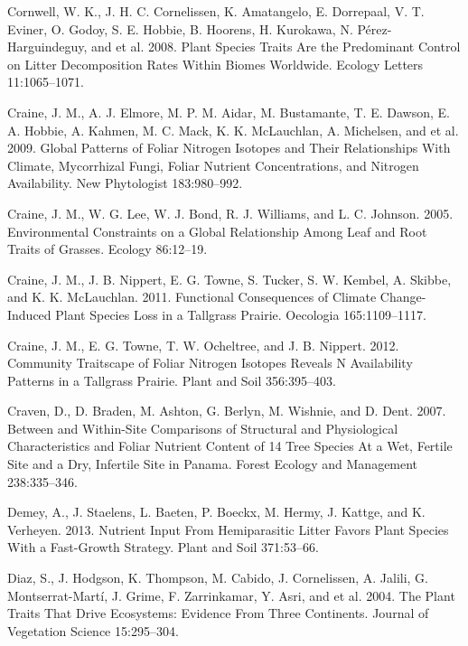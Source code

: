 \documentclass[11pt]{article}
\begin{document}
\begin{hangparas}{1.5em}{1}
\hypertarget{citeproc_bib_item_36}{Cornwell, W. K., J. H. C. Cornelissen, K. Amatangelo, E. Dorrepaal, V. T. Eviner, O. Godoy, S. E. Hobbie, B. Hoorens, H. Kurokawa, N. Pérez-Harguindeguy, and et al. 2008. Plant Species Traits Are the Predominant Control on Litter Decomposition Rates Within Biomes Worldwide. Ecology Letters 11:1065–1071.}

\hypertarget{citeproc_bib_item_37}{Craine, J. M., A. J. Elmore, M. P. M. Aidar, M. Bustamante, T. E. Dawson, E. A. Hobbie, A. Kahmen, M. C. Mack, K. K. McLauchlan, A. Michelsen, and et al. 2009. Global Patterns of Foliar Nitrogen Isotopes and Their Relationships With Climate, Mycorrhizal Fungi, Foliar Nutrient Concentrations, and Nitrogen Availability. New Phytologist 183:980–992.}

\hypertarget{citeproc_bib_item_38}{Craine, J. M., W. G. Lee, W. J. Bond, R. J. Williams, and L. C. Johnson. 2005. Environmental Constraints on a Global Relationship Among Leaf and Root Traits of Grasses. Ecology 86:12–19.}

\hypertarget{citeproc_bib_item_39}{Craine, J. M., J. B. Nippert, E. G. Towne, S. Tucker, S. W. Kembel, A. Skibbe, and K. K. McLauchlan. 2011. Functional Consequences of Climate Change-Induced Plant Species Loss in a Tallgrass Prairie. Oecologia 165:1109–1117.}

\hypertarget{citeproc_bib_item_40}{Craine, J. M., E. G. Towne, T. W. Ocheltree, and J. B. Nippert. 2012. Community Traitscape of Foliar Nitrogen Isotopes Reveals N Availability Patterns in a Tallgrass Prairie. Plant and Soil 356:395–403.}

\hypertarget{citeproc_bib_item_41}{Craven, D., D. Braden, M. Ashton, G. Berlyn, M. Wishnie, and D. Dent. 2007. Between and Within-Site Comparisons of Structural and Physiological Characteristics and Foliar Nutrient Content of 14 Tree Species At a Wet, Fertile Site and a Dry, Infertile Site in Panama. Forest Ecology and Management 238:335–346.}

\hypertarget{citeproc_bib_item_42}{Demey, A., J. Staelens, L. Baeten, P. Boeckx, M. Hermy, J. Kattge, and K. Verheyen. 2013. Nutrient Input From Hemiparasitic Litter Favors Plant Species With a Fast-Growth Strategy. Plant and Soil 371:53–66.}

\hypertarget{citeproc_bib_item_43}{Diaz, S., J. Hodgson, K. Thompson, M. Cabido, J. Cornelissen, A. Jalili, G. Montserrat-Martí, J. Grime, F. Zarrinkamar, Y. Asri, and et al. 2004. The Plant Traits That Drive Ecosystems: Evidence From Three Continents. Journal of Vegetation Science 15:295–304.}


\end{hangparas}
\end{document}
